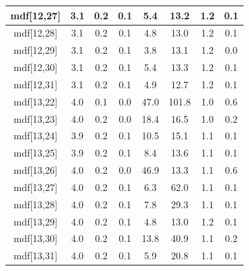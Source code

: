 \begin{longtable}{|c|c|c|c|c|c|c|c|}
\hline
mdf[12,27] & 3.1 & 0.2 & 0.1 & 5.4 & 13.2 & 1.2 & 0.1 \\
\hline
mdf[12,28] & 3.1 & 0.2 & 0.1 & 4.8 & 13.0 & 1.2 & 0.1 \\
\hline
mdf[12,29] & 3.1 & 0.2 & 0.1 & 3.8 & 13.1 & 1.2 & 0.0 \\
\hline
mdf[12,30] & 3.1 & 0.2 & 0.1 & 5.4 & 13.3 & 1.2 & 0.1 \\
\hline
mdf[12,31] & 3.1 & 0.2 & 0.1 & 4.9 & 12.7 & 1.2 & 0.1 \\
\hline
mdf[13,22] & 4.0 & 0.1 & 0.0 & 47.0 & 101.8 & 1.0 & 0.6 \\
\hline
mdf[13,23] & 4.0 & 0.2 & 0.0 & 18.4 & 16.5 & 1.0 & 0.2 \\
\hline
mdf[13,24] & 3.9 & 0.2 & 0.1 & 10.5 & 15.1 & 1.1 & 0.1 \\
\hline
mdf[13,25] & 3.9 & 0.2 & 0.1 & 8.4 & 13.6 & 1.1 & 0.1 \\
\hline
mdf[13,26] & 4.0 & 0.2 & 0.0 & 46.9 & 13.3 & 1.1 & 0.6 \\
\hline
mdf[13,27] & 4.0 & 0.2 & 0.1 & 6.3 & 62.0 & 1.1 & 0.1 \\
\hline
mdf[13,28] & 4.0 & 0.2 & 0.1 & 7.8 & 29.3 & 1.1 & 0.1 \\
\hline
mdf[13,29] & 4.0 & 0.2 & 0.1 & 4.8 & 13.0 & 1.2 & 0.1 \\
\hline
mdf[13,30] & 4.0 & 0.2 & 0.1 & 13.8 & 40.9 & 1.1 & 0.2 \\
\hline
mdf[13,31] & 4.0 & 0.2 & 0.1 & 5.9 & 20.8 & 1.1 & 0.1 \\
\hline
\end{longtable}
